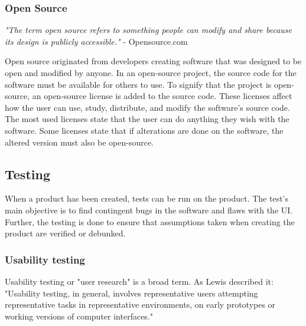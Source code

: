\subsubsection{Open Source}%
\label{ssub:Open Source}

\textit{"The term open source refers to something people can modify and share because its design is publicly accessible."} - Opensource.com\cite{WhatOpenSource}

Open source originated from developers creating software that was designed to be open and modified by anyone. In an open-source project, the source code for the software must be available for others to use. To signify that the project is open-source, an open-source license is added to the source code. These licenses affect how the user can use, study, distribute, and modify the software's source code. The most used licenses state that the user can do anything they wish with the software. Some licenses state that if alterations are done on the software, the altered version must also be open-source. 







\subsection{Testing}%
\label{sub:Testing}
When a product has been created, tests can be run on the product. The test's main objective is to find contingent bugs in the software and flaws with the UI. Further, the testing is done to ensure that assumptions taken when creating the product are verified or debunked.

\subsubsection{Usability testing}%
\label{ssub:User testing}
Usability testing or "user research" is a broad term. As Lewis\cite{lewis2006usability} described it: "Usability testing, in general, involves representative users attempting representative tasks in representative environments, on early prototypes or working versions of computer interfaces." 

